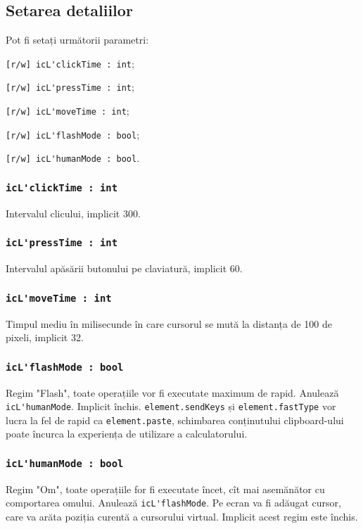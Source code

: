 \subsection{Setarea detaliilor}

Pot fi setați următorii parametri:
\begin{icItems}
	\item \lstinline|[r/w] icL'clickTime : int|;
	\item \lstinline|[r/w] icL'pressTime : int|;
	\item \lstinline|[r/w] icL'moveTime : int|;
	\item \lstinline|[r/w] icL'flashMode : bool|;
	\item \lstinline|[r/w] icL'humanMode : bool|.
\end{icItems}

\subsubsection{\lstinline|icL'clickTime : int|}

Intervalul clicului, implicit 300.

\subsubsection{\lstinline|icL'pressTime : int|}

Intervalul apăsării butonului pe claviatură, implicit 60.

\subsubsection{\lstinline|icL'moveTime : int|}

Timpul mediu în milisecunde în care cursorul se mută la distanța de 100 de pixeli, implicit 32.

\subsubsection{\lstinline|icL'flashMode : bool|}

Regim "Flash", toate operațiile vor fi executate maximum de rapid. Anulează \lstinline|icL'humanMode|. Implicit închis. \lstinline|element.sendKeys| și \lstinline|element.fastType| vor lucra la fel de rapid ca \lstinline|element.paste|, schimbarea conținutului clipboard-ului poate încurca la experiența de utilizare a calculatorului.

\subsubsection{\lstinline|icL'humanMode : bool|}

Regim "Om", toate operațiile for fi executate încet, cît mai asemănător cu comportarea omului. Anulează \lstinline|icL'flashMode|. Pe ecran va fi adăugat cursor, care va arăta poziția curentă a cursorului virtual. Implicit acest regim este închis.

